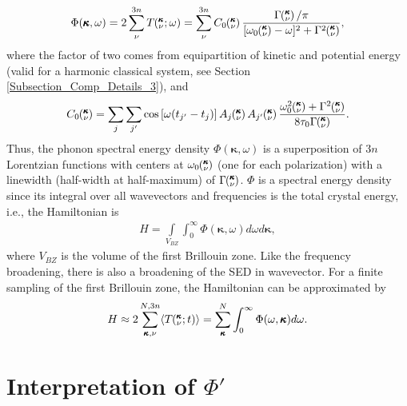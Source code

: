 \documentclass[aps,prb,preprint,superscriptaddress,amsmath,amssymb,floatfix]{revtex4}
\newcommand{\kvt}{\mspace{-4.0mu}\left(\mspace{-8.0mu}\begin{smallmatrix}&\pmb{\kappa} \\&\nu\end{smallmatrix}\mspace{-2.0mu};t\right)}
\newcommand{\kvw}{\mspace{-4.0mu}\left(\mspace{-8.0mu}\begin{smallmatrix}&\pmb{\kappa} \\&\nu\end{smallmatrix}\mspace{-2.0mu};\omega\right)}
\newcommand{\kv}{\mspace{-4.0mu}\left(\mspace{-8.0mu}\begin{smallmatrix}&\pmb{\kappa} \\&\nu\end{smallmatrix}\mspace{-3.0mu}\right)}
\begin{document}
\begin{equation}\label{A:E:Lorentzian_NMD}
\begin{split}
\Phi(\pmb{\kappa},\omega) = 2\sum_{\nu}^{3n} T\kvw=\sum_{\nu}^{3n}C_0\kv\frac{\Gamma\kv/\pi}{[\omega_0\kv-\omega]^2+\Gamma^2\kv},
\end{split}
\end{equation}
where the factor of two comes from equipartition of kinetic and potential energy (valid for a harmonic classical system, see Section \ref{Subsection_Comp_Details_3}), and
\begin{equation}\label{A:E:C_0}
\begin{split}
C_0\kv = \sum_j\sum_{j'}\cos\left[\omega (t_{j'}-t_j)\right]A_j\kv A_{j'}\kv\frac{\omega_0^2\kv+\Gamma^2\kv}{8\tau_0\Gamma\kv}.
\end{split}
\end{equation}
Thus, the phonon spectral energy density $\Phi(\pmb{\kappa},\omega)$ is a superposition of $3n$ Lorentzian
functions with centers at $\omega_0\kv$ (one for each polarization) with a linewidth (half-width at half-maximum) of
$\Gamma\kv$. $\Phi$ is a spectral energy density since its integral over all wavevectors and frequencies is the total crystal energy, i.e., the Hamiltonian is
\begin{equation}\label{A:E:equipartition}
\begin{split}
H=\int\limits_{V_{BZ}} \int_{0}^{\infty}\Phi(\pmb{\kappa},\omega)d\omega d\pmb{\kappa},
\end{split}
\end{equation}
where $V_{BZ}$ is the volume of the first Brillouin zone.  Like the frequency broadening, there is also a broadening of the SED in wavevector.\cite{turneythesis} For a finite sampling of the first Brillouin zone, the Hamiltonian can be approximated by
\begin{equation}\label{A:E:equipartition}
\begin{split}
H \approx 2\sum_{\pmb{\kappa},\nu}^{N,3n}\langle T\kvt\rangle = \sum_{\pmb{\kappa}}^N \int_{0}^{\infty}\Phi(\omega,\pmb{\kappa})d\omega.
\end{split}
\end{equation}

\section{\label{Appendix_B}Interpretation of $\Phi'$}
\end{document}
